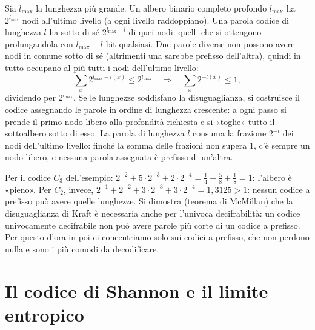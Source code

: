 
\begin{dimostrazione}
 Sia $l_{\max}$ la lunghezza più grande. Un albero binario completo profondo $l_{\max}$ ha
$2^{l_{\max}}$ nodi all'ultimo livello (a ogni livello raddoppiano). Una parola codice di lunghezza $l$ ha sotto di sé
$2^{l_{\max} - l}$ di quei nodi: quelli che si ottengono prolungandola con $l_{\max} - l$ bit qualsiasi.
 Due parole diverse non possono avere nodi in comune sotto di sé (altrimenti una
sarebbe prefisso dell'altra), quindi in tutto occupano al più tutti i nodi dell'ultimo livello:
\[ \sum_{x} 2^{l_{\max} - l(x)} \leq 2^{l_{\max}} \quad\Longrightarrow\quad \sum_x 2^{-l(x)} \leq 1 , \]
dividendo per $2^{l_{\max}}$.
 Se le lunghezze soddisfano la disuguaglianza, si costruisce il codice assegnando le parole in ordine
di lunghezza crescente: a ogni passo si prende il primo nodo libero alla profondità richiesta e si «toglie» tutto il
sottoalbero sotto di esso. La parola di lunghezza $l$ consuma la frazione $2^{-l}$ dei nodi dell'ultimo livello: finché
la somma delle frazioni non supera 1, c'è sempre un nodo libero, e nessuna parola assegnata è prefisso di un'altra.
\end{dimostrazione}

Per il codice $C_3$ dell'esempio: $2^{-2} + 5 \cdot 2^{-3} + 2 \cdot 2^{-4} = \frac14 + \frac58 + \frac18 = 1$: l'albero
è «pieno». Per $C_2$, invece, $2^{-1} + 2^{-2} + 3 \cdot 2^{-3} + 3 \cdot 2^{-4} = 1{,}3125 > 1$: nessun codice a prefisso
può avere quelle lunghezze. Si dimostra (teorema di McMillan) che la disuguaglianza di Kraft è necessaria anche per
l'univoca decifrabilità: un codice univocamente decifrabile non può avere parole più corte di un codice a prefisso. Per
questo d'ora in poi ci concentriamo solo sui codici a prefisso, che non perdono nulla e sono i più comodi da
decodificare.

\section{Il codice di Shannon e il limite entropico}

